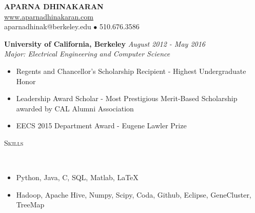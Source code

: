 \documentclass[9pt]{extarticle}
\newenvironment{changemargin}[2]{%
  \begin{list}{}{%
    \setlength{\topsep}{0pt}%
    \setlength{\leftmargin}{#1}%
    \setlength{\rightmargin}{#2}%
    \setlength{\listparindent}{\parindent}%
    \setlength{\itemindent}{\parindent}%
    \setlength{\parsep}{\parskip}%
  }%
  \item[]}{\end{list}
}
\newcommand{\lineover}{
	\begin{changemargin}{-0.05in}{-0.05in}
		\vspace*{-8pt}
		\hrulefill \\
		\vspace*{-2pt}
	\end{changemargin}
}
\newcommand{\header}[1]{
    \vspace{5pt}
	\begin{changemargin}{-0.5in}{-0.5in}
		\scshape{#1}\\
  	\lineover
	\end{changemargin}
	\vspace{5pt}
}
\newenvironment{body} {
	\vspace*{-9pt}
	\begin{changemargin}{-0.5in}{-0.5in}
  }	
	{\end{changemargin}
}
\newcommand{\name}[5]{
	\begin{changemargin}{-0.5in}{-0.5in}
		\begin{center}
			{\Huge \scshape {\textbf{#1}}}\\ \smallskip
			{\url{#2}}\\ \smallskip 
			{#3}\\ \smallskip
		\end{center}
	\end{changemargin}
}
\begin{document}

\name{APARNA DHINAKARAN}{www.aparnadhinakaran.com}{aparnadhinak@berkeley.edu $\bullet$ 510.676.3586}


\header{Education}
\begin{body}
	\textbf{University of California, Berkeley} \hfill \emph{August 2012 - May 2016}{} \\
	\emph{Major: Electrical Engineering and Computer Science}
	\vspace{-2pt} 
	\begin{itemize}
	\itemsep -2pt
		\item[] Regents and Chancellor's Scholarship Recipient - Highest Undergraduate Honor 
		\item[] Leadership Award Scholar - Most Prestigious Merit-Based Scholarship awarded by CAL Alumni Association
		\item[] EECS 2015 Department Award - Eugene Lawler Prize 
		\end{itemize}
\end{body}

%
%
%
\vspace*{-5pt}
\header{Skills}

\begin{body}
	\begin{itemize}
    \itemsep -2pt
	\item[] Python, Java, C, SQL, Matlab, \LaTeX
	\item[] Hadoop, Apache Hive, Numpy, Scipy, Coda, Github, Eclipse, GeneCluster, TreeMap
	\end{itemize}
\end{body}
\end{document}
